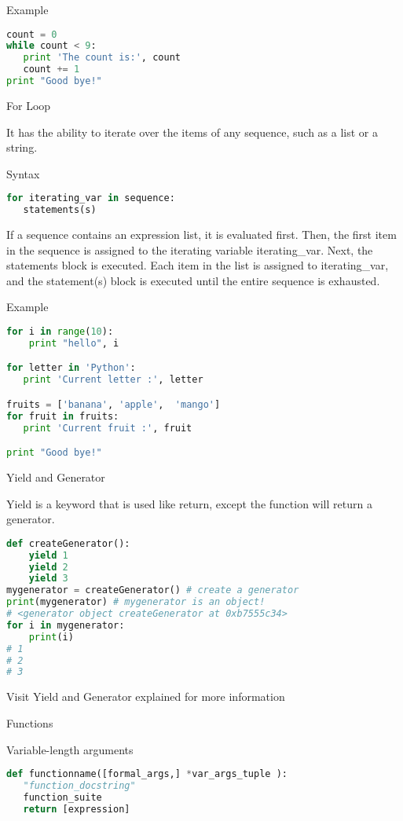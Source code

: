 Example

\begin{lstlisting}[language=Python]
count = 0
while count < 9:
   print 'The count is:', count
   count += 1
print "Good bye!"
\end{lstlisting}


For Loop

It has the ability to iterate over the items of any sequence, such as a list or a string.

Syntax

\begin{lstlisting}[language=Python]
for iterating_var in sequence:
   statements(s)
\end{lstlisting}

If a sequence contains an expression list, it is evaluated first. Then, the first item in the sequence is assigned to the iterating variable iterating_var. Next, the statements block is executed. Each item in the list is assigned to iterating_var, and the statement(s) block is executed until the entire sequence is exhausted.

Example

\begin{lstlisting}[language=Python]
for i in range(10):
    print "hello", i

for letter in 'Python':
   print 'Current letter :', letter

fruits = ['banana', 'apple',  'mango']
for fruit in fruits:
   print 'Current fruit :', fruit

print "Good bye!"
\end{lstlisting}

Yield and Generator

Yield is a keyword that is used like return, except the function will return a generator.

\begin{lstlisting}[language=Python]
def createGenerator():
    yield 1
    yield 2
    yield 3
mygenerator = createGenerator() # create a generator
print(mygenerator) # mygenerator is an object!
# <generator object createGenerator at 0xb7555c34>
for i in mygenerator:
    print(i)
# 1
# 2
# 3
\end{lstlisting}


Visit Yield and Generator explained for more information

Functions

Variable-length arguments

\begin{lstlisting}[language=Python]
def functionname([formal_args,] *var_args_tuple ):
   "function_docstring"
   function_suite
   return [expression]
\end{lstlisting}

